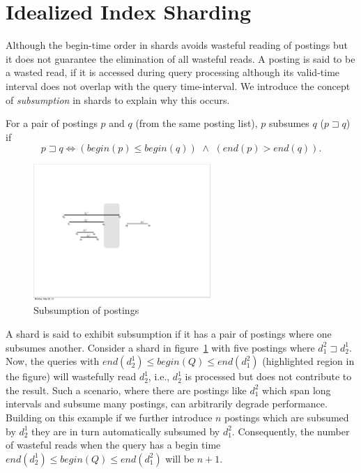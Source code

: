 \section{Idealized Index Sharding}
\label{chap:sharding:sec:ideal_part}

Although the begin-time order in shards avoids wasteful reading of
postings but it does not guarantee the elimination of all wasteful reads. 
A posting is said to be a wasted read, if it is accessed during
query processing although its valid-time interval does not overlap
with the query time-interval. We introduce the concept of \emph{subsumption} in shards to explain why this occurs.

\begin{definition}
\label{def:staircase}
For a pair of postings $p$ and $q$ (from the same posting list), $p$ subsumes $q$ ($p \sqsupset q$) if
$$
p \sqsupset q \Leftrightarrow  \left( begin (p)\leq begin (q) \right) \,\,\wedge \,\, \left( end(p) > end(q) \right).
$$ 
\end{definition}

\begin{figure}[tb]
	\centering
		\includegraphics[width=0.6\textwidth]{resources/subsumption.pdf}
	\caption{Subsumption of postings}
	 \label{fig:subsumption}
\end{figure}

A shard is said to exhibit subsumption if it has a pair of postings where one subsumes another. Consider a shard in figure~\ref{fig:subsumption} with 
five postings where $d_1^2 \sqsupset d_2^1$. 
Now, the queries with $end(d_2^1) \leq begin(Q)\leq end(d_1^2)$ (highlighted region in the figure) will wastefully read $d_2^1$, i.e., $d_2^1$ is processed but does not contribute to the result. Such a scenario, where there are postings like $d_1^2$ which span long intervals and subsume many postings, can arbitrarily degrade performance. Building on this example if we further introduce $n$ postings which are subsumed by $d_2^1$ they are in turn automatically subsumed by $d_1^2$. Consequently, the number of wasteful reads when the query has a begin time $end(d_2^1) \leq begin(Q)\leq end(d_1^2)$ will be $n+1$.

